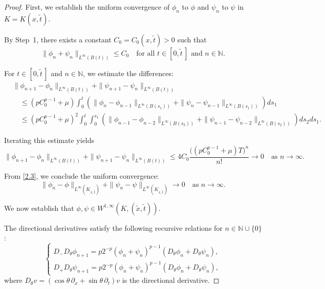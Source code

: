 \documentclass[10pt,a4paper]{amsart}
\begin{document}
\begin{proof}
First, we establish the uniform convergence of $\phi_n$ to $\phi$ and $\psi_n$ to $\psi$ in $K = K(x, \tilde{t})$.  

By Step~1, there exists a constant $C_0 = C_0(x, \tilde{t}) > 0$ such that
\begin{equation}
  \label{eq:2.51}
  \|\phi_n + \psi_n\|_{L^\infty(B(t))} \leq C_0 \quad \text{for all } t \in [0, \tilde{t}\,] \text{ and } n \in \mathbb{N}.
\end{equation}

For $t \in [0, \tilde{t}\,]$ and $n \in \mathbb{N}$, we estimate the differences:
\begin{align*}
&\|\phi_{n+1} - \phi_n\|_{L^\infty(B(t))} + \|\psi_{n+1} - \psi_n\|_{L^\infty(B(t))} \\
&\quad \leq (p C_0^{p-1} + \mu) \int_0^t \left( 
\|\phi_n - \phi_{n-1}\|_{L^\infty(B(s_1))} + \|\psi_n - \psi_{n-1}\|_{L^\infty(B(s_1))} 
\right) ds_1 \\
&\quad \leq (p C_0^{p-1} + \mu)^2 \int_0^t \int_0^{s_1} \left( 
\|\phi_{n-1} - \phi_{n-2}\|_{L^\infty(B(s_2))} + \|\psi_{n-1} - \psi_{n-2}\|_{L^\infty(B(s_2))} 
\right) ds_2 ds_1.
\end{align*}

Iterating this estimate yields
$$
\|\phi_{n+1} - \phi_n\|_{L^\infty(B(t))} + \|\psi_{n+1} - \psi_n\|_{L^\infty(B(t))} 
\leq 4 C_0 \frac{\big((p C_0^{p-1} + \mu) T\big)^n}{n!} \to 0 \quad \text{as } n \to \infty.
$$

From \eqref{2.3}, we conclude the uniform convergence:
$$
\|\phi_n - \phi\|_{L^\infty(K_{x, \tilde{t}})} + \|\psi_n - \psi\|_{L^\infty(K_{x, \tilde{t}})} \to 0 \quad \text{as } n \to \infty.
$$


We now establish that $\phi, \psi \in W^{1,\infty}(K, (\tilde{x}, \tilde{t}))$. 

The directional derivatives satisfy the following recursive relations for $n \in \mathbb{N} \cup \{0\}$:
$$
\begin{cases}
D_- D_\theta \phi_{n+1} = p 2^{-p} (\phi_n + \psi_n)^{p-1} (D_\theta \phi_n + D_\theta \psi_n), \\
D_+ D_\theta \psi_{n+1} = p 2^{-p} (\phi_n + \psi_n)^{p-1} (D_\theta \phi_n + D_\theta \psi_n),
\end{cases}
$$
where $D_\theta v = (\cos \theta \, \partial_x + \sin \theta \, \partial_t)v$ is the directional derivative.


\end{proof}
\end{document}
